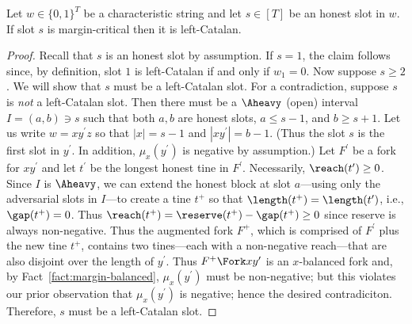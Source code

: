    \begin{fact}\label{fact:neg-margin-implies-catalan}
      Let $w \in \{0,1\}^T$ be a characteristic string 
      and let $s \in [T]$ be an honest slot in $w$.  
      If slot $s$ is margin-critical then 
      it is left-Catalan.
    \end{fact}
    \begin{proof}
      Recall that $s$ is an honest slot by assumption. 
      If $s = 1$, the claim follows since, by definition, 
      slot $1$ is left-Catalan if and only if $w_1 = 0$. 
      Now suppose $s \geq 2$.
      We will show that $s$ must be a left-Catalan slot. 
      For a contradiction, suppose $s$ is \emph{not} a left-Catalan slot. 
      Then there must be a $\Aheavy$ (open) interval $I = (a, b) \ni s$ 
      such that both $a, b$ are honest slots, $a \leq s - 1$, and $b \geq s + 1$. 
      Let us write $w = xy^\prime z$ 
      so that $|x| = s - 1$ and $|xy^\prime| = b - 1$. 
      (Thus the slot $s$ is the first slot in $y^\prime$. 
      In addition, $\mu_x(y^\prime)$ is negative by assumption.)
      Let $F^\prime$ be a fork for $xy^\prime$ 
      and let $t^\prime$ be the longest honest tine in $F^\prime$. 
      Necessarily, $\reach(t^\prime) \geq 0$.
      Since $I$ is $\Aheavy$, we can 
      extend the honest block at slot $a$---using 
      only the adversarial slots in $I$---to 
      create a tine $t^+$ so that $\length(t^+) = \length(t^\prime)$, 
      i.e., $\gap(t^+) = 0$. 
      Thus $\reach(t^+) = \reserve(t^+) - \gap(t^+) \geq 0$ 
      since reserve is always non-negative.
      Thus the augmented fork $F^+$, 
      which is comprised of $F^\prime$ plus the new tine $t^+$, 
      contains two tines---each with a non-negative reach---that are also 
      disjoint over the length of $y^\prime$. 
      Thus $F^+ \Fork xy^\prime$ is an $x$-balanced fork and, 
      by Fact~\ref{fact:margin-balanced}, 
      $\mu_x(y^\prime)$ must be non-negative; 
      but this violates our prior observation that $\mu_x(y^\prime)$ is negative; 
      hence the desired contradiciton.
      Therefore, $s$ must be a left-Catalan slot.
      
    \end{proof}


